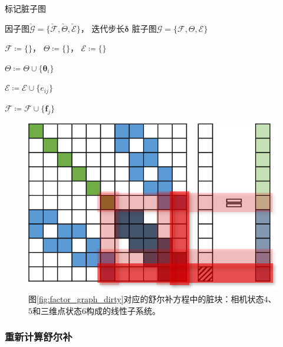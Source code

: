 \begin{algorithm}
\caption{标记脏子图}
\begin{algorithmic}
    \Require 因子图$\check{\mathcal{G}}=\{\check{\mathcal{F}},\check{\Theta},\check{\mathcal{E}}\}$，
             迭代步长$\bm{\delta}$
    \Ensure 脏子图$\mathcal{G}=\{\mathcal{F},\Theta,\mathcal{E}\}$

    \State $\mathcal{F}\coloneqq\{\}$，
           $\Theta\coloneqq\{\}$，
           $\mathcal{E}\coloneqq\{\}$

        \State $\Theta\coloneqq\Theta\cup\{\bm{\theta}_i\}$

            \State $\mathcal{E} \coloneqq \mathcal{E} \cup \{e_{ij}\}$

            \State $\mathcal{F} \coloneqq \mathcal{F} \cup \{\bm{f}_j\}$
        \EndFor
    \EndFor
\end{algorithmic}
\label{alg:mark_dirty}
\end{algorithm}

\begin{figure}[htb!]
    \centering
    \includegraphics{figs/normal_eq_dirty.png}
    \caption{图\ref{fig:factor_graph_dirty}对应的舒尔补方程中的脏块：相机状态$4$、$5$和三维点状态$6$构成的线性子系统。}
    \label{fig:normal_eq_dirty}
\end{figure}

\subsubsection{重新计算舒尔补}

